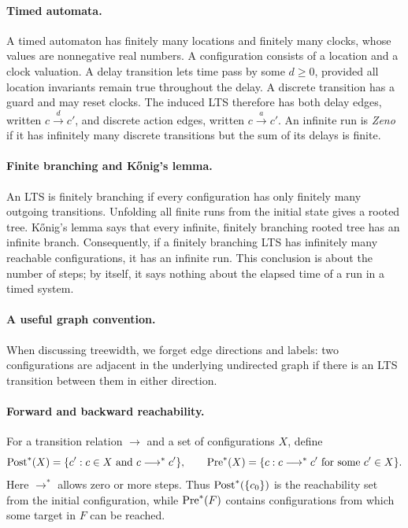 \documentclass{tutorial}
\begin{document}
\paragraph{Timed automata.}
A timed automaton has finitely many locations and finitely many clocks,
whose values are nonnegative real numbers. A configuration consists of a
location and a clock valuation. A delay transition lets time pass by some
$d\geq 0$, provided all location invariants remain true throughout the
delay. A discrete transition has a guard and may reset clocks. The induced
LTS therefore has both delay edges, written $c\xrightarrow{d}c'$, and
discrete action edges, written $c\xrightarrow{a}c'$. An infinite run is
\emph{Zeno}{\footnotemark} if it has infinitely many discrete transitions but the sum of
its delays is finite.

\paragraph{Finite branching and K\H{o}nig's lemma.}
An LTS is finitely branching if every configuration has only finitely many
outgoing transitions. Unfolding all finite runs from the initial state
gives a rooted tree. K\H{o}nig's lemma says that every infinite, finitely
branching rooted tree has an infinite branch. Consequently, if a finitely
branching LTS has infinitely many reachable configurations, it has an
infinite run. This conclusion is about the number of steps; by itself, it
says nothing about the elapsed time of a run in a timed system.

\paragraph{A useful graph convention.}
When discussing treewidth, we forget edge directions and labels: two
configurations are adjacent in the underlying undirected graph if there is
an LTS transition between them in either direction.

\paragraph{Forward and backward reachability.}
For a transition relation $\longrightarrow$ and a set of configurations
$X$, define
\[
      \operatorname{Post}^*(X)=\{c': c\in X\text{ and }c\longrightarrow^*c'\},
      \qquad
      \operatorname{Pre}^*(X)=\{c: c\longrightarrow^*c'\text{ for some }c'\in X\}.
\]
Here $\longrightarrow^*$ allows zero or more steps. Thus
$\operatorname{Post}^*(\{c_0\})$ is the reachability set from the initial
configuration, while $\operatorname{Pre}^*(F)$ contains configurations
from which some target in $F$ can be reached.
\end{document}
